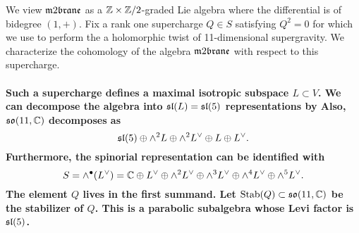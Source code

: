 \documentclass[11pt]{amsart}
\begin{document}
We view $\m2$ as a $\mathbb Z \times \mathbb Z/2$-graded Lie algebra where the differential is of bidegree $(1,+)$.
Fix a rank one supercharge $Q \in S$ satisfying $Q^2 = 0$ for which we use to perform the a holomorphic twist of 11-dimensional supergravity.  
We characterize the cohomology of the algebra $\m2$ with respect to this supercharge. 

\paragraph{
Such a supercharge defines a maximal isotropic subspace $L \subset V$. 
We can decompose the algebra into $\mathfrak{sl}(L) = \mathfrak{sl}(5)$ representations by
Also, $\mathfrak{so}(11, \mathbb C)$ decomposes as
\[
\mathfrak{sl}(5) \oplus \wedge^2 L \oplus \wedge^2 L^\vee \oplus L \oplus L^\vee .
\]
Furthermore, the spinorial representation can be identified with
\[
S = \wedge^\bullet (L^\vee) = \mathbb C \oplus L^\vee \oplus \wedge^2 L^\vee \oplus \wedge^3 L^\vee \oplus \wedge^4 L^\vee \oplus \wedge^5 L^\vee .
\]
The element $Q$ lives in the first summand.
Let ${\rm Stab}(Q) \subset \mathfrak{so}(11,\mathbb C)$ be the stabilizer of $Q$. 
This is a parabolic subalgebra whose Levi factor is $\mathfrak{sl}(5)$. }
\end{document}
